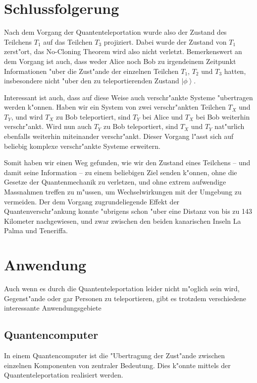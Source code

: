 \begin{refsection}
\section{Schlussfolgerung}

Nach dem Vorgang der Quantenteleportation wurde also der Zustand des Teilchens $T_{1}$ auf das Teilchen $T_{3}$ projiziert. Dabei wurde der Zustand von $T_{1}$ zerst"ort, das No-Cloning Theorem wird also nicht verletzt. Bemerkenswert an dem Vorgang ist auch, dass weder Alice noch Bob zu irgendeinem Zeitpunkt Informationen "uber die Zust"ande der einzelnen Teilchen $T_{1}$, $T_{2}$ und $T_{3}$ hatten, insbesondere nicht "uber den zu teleportierenden Zustand $\left|\phi\right\rangle$. 

Interessant ist auch, dass auf diese Weise auch verschr"ankte Systeme "ubertragen werden k"onnen. Haben wir ein System von zwei verschr"ankten Teilchen $T_{X}$ und $T_{Y}$, und wird $T_{X}$ zu Bob teleportiert, sind $T_{Y}$ bei Alice und $T_{X}$ bei Bob weiterhin verschr"ankt. Wird nun auch $T_{Y}$ zu Bob teleportiert, sind $T_{X}$ und $T_{Y}$ nat"urlich ebenfalls weiterhin miteinander verschr"ankt. Dieser Vorgang l"asst sich auf beliebig komplexe verschr"ankte Systeme erweitern. 

Somit haben wir einen Weg gefunden, wie wir den Zustand eines Teilchens -- und damit seine Information -- zu einem beliebigen Ziel senden k"onnen, ohne die Gesetze der Quantenmechanik zu verletzen, und ohne extrem aufwendige Massnahmen treffen zu m"ussen, um Wechselwirkungen mit der Umgebung zu vermeiden. Der dem Vorgang zugrundeliegende Effekt der Quantenverschr"ankung konnte "ubrigens schon "uber eine Distanz von bis zu 143 Kilometer nachgewiesen, und zwar zwischen den beiden kanarischen Inseln La Palma und Teneriffa.
\section{Anwendung}

Auch wenn es durch die Quantenteleportation leider nicht m"oglich sein wird, Gegenst"ande oder gar Personen zu teleportieren, gibt es trotzdem verschiedene interessante Anwendungsgebiete

\subsection{Quantencomputer}

In einem Quantencomputer ist die "Ubertragung der Zust"ande zwischen einzelnen Komponenten von zentraler Bedeutung. Dies k"onnte mittels der Quantenteleportation realisiert werden.


\end{refsection}
